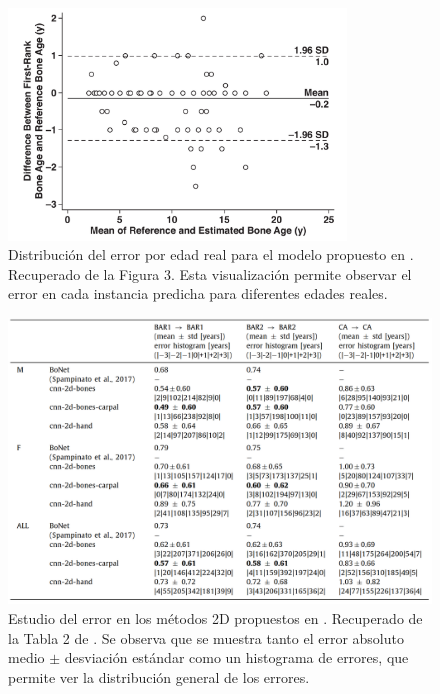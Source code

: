 \begin{figure}[h]
    \centering
    \includegraphics[width=0.8\textwidth]{capitulos/cap_03/imagenes/error_distribution.png}
    \caption[
        Distribución del error por edad real para el modelo propuesto en \cite{kim2017}. 
    ]{
        Distribución del error por edad real para el modelo propuesto en \cite{kim2017}. 
        Recuperado de la Figura 3. 
        Esta visualización permite observar el error en cada instancia predicha para diferentes edades reales. 
    }
    \label{fig:error_distribution_by_age}
\end{figure}

\begin{figure}[h]
    \centering
    \includegraphics[width=\textwidth]{capitulos/cap_03/imagenes/error_study.png}
    \caption[
        Estudio del error en los métodos 2D propuestos en \cite{stern2019}.
    ]{
        Estudio del error en los métodos 2D propuestos en \cite{stern2019}. 
        Recuperado de la Tabla 2 de \cite{stern2019}.
        Se observa que se muestra tanto el error absoluto medio $\pm$ desviación estándar como un 
        histograma de errores, que permite ver la distribución general de los errores. 
    }
    \label{fig:error_study_stern2019}
\end{figure}

